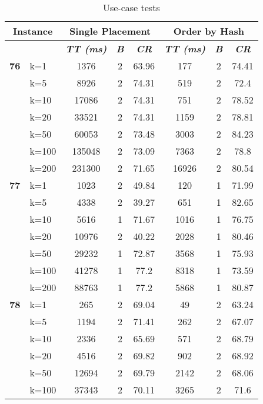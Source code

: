     \begin{table}[htbp]
    \caption{Use-case tests}
    \begin{tabular}{|l|l|c|c|c|c|c|c|}
    
    \multicolumn{ 2}{|c|}{\textbf{Instance}} & \multicolumn{ 3}{c|}{\textbf{Single Placement}} & \multicolumn{ 3}{c|}{\textbf{Order by Hash}} \\ \hline
    \multicolumn{ 2}{|l|}{} & \textbf{\textit{TT (ms)}} & \textbf{\textit{B}} & \textbf{\textit{CR}} & \textbf{\textit{TT (ms)}} & \textbf{\textit{B}} & \textbf{\textit{CR}} \\ \hline
    \multicolumn{1}{|r|}{\textbf{76}} & k=1 & 1376 & 2 & 63.96 & 177 & 2 & 74.41 \\ 
     & k=5 & 8926 & 2 & 74.31 & 519 & 2 & 72.4 \\ 
     & k=10 & 17086 & 2 & 74.31 & 751 & 2 & 78.52 \\ 
     & k=20 & 33521 & 2 & 74.31 & 1159 & 2 & 78.81 \\ 
     & k=50 & 60053 & 2 & 73.48 & 3003 & 2 & 84.23 \\ 
     & k=100 & 135048 & 2 & 73.09 & 7363 & 2 & 78.8 \\ 
     & k=200 & 231300 & 2 & 71.65 & 16926 & 2 & 80.54 \\ \hline
    \multicolumn{1}{|r|}{\textbf{77}} & k=1 & 1023 & 2 & 49.84 & 120 & 1 & 71.99 \\ 
     & k=5 & 4338 & 2 & 39.27 & 651 & 1 & 82.65 \\ 
     & k=10 & 5616 & 1 & 71.67 & 1016 & 1 & 76.75 \\ 
     & k=20 & 10976 & 2 & 40.22 & 2028 & 1 & 80.46 \\ 
     & k=50 & 29232 & 1 & 72.87 & 3568 & 1 & 75.93 \\ 
     & k=100 & 41278 & 1 & 77.2 & 8318 & 1 & 73.59 \\ 
     & k=200 & 88763 & 1 & 77.2 & 5868 & 1 & 80.87 \\ \hline
    \multicolumn{1}{|r|}{\textbf{78}} & k=1 & 265 & 2 & 69.04 & 49 & 2 & 63.24 \\ 
     & k=5 & 1194 & 2 & 71.41 & 262 & 2 & 67.07 \\ 
     & k=10 & 2336 & 2 & 65.69 & 571 & 2 & 68.79 \\ 
     & k=20 & 4516 & 2 & 69.82 & 902 & 2 & 68.92 \\ 
     & k=50 & 12694 & 2 & 69.79 & 2142 & 2 & 68.06 \\ 
     & k=100 & 37343 & 2 & 70.11 & 3265 & 2 & 71.6 \\ 

\end{tabular}
\end{table}
